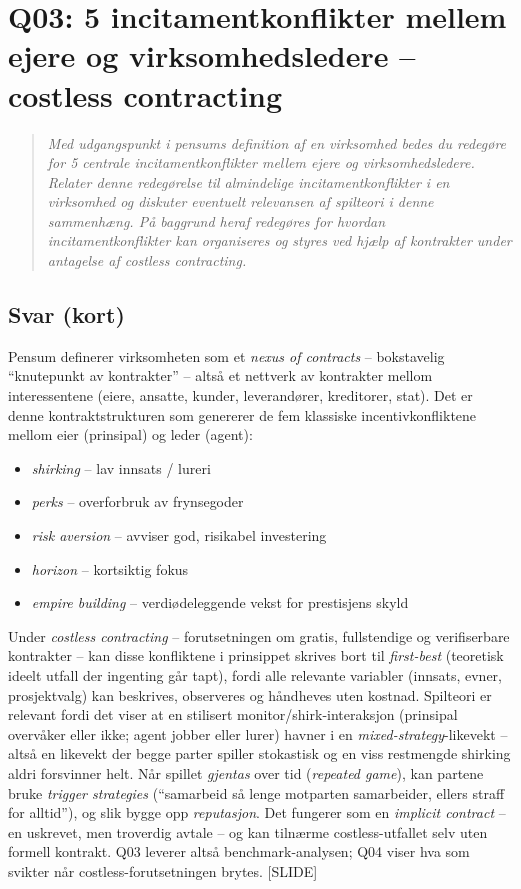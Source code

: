 \section{Q03: 5 incitamentkonflikter mellem ejere og virksomhedsledere -- costless contracting}\label{q:03}

\begin{quote}
\emph{Med udgangspunkt i pensums definition af en virksomhed bedes du redegøre for 5 centrale incitamentkonflikter mellem ejere og virksomhedsledere. Relater denne redegørelse til almindelige incitamentkonflikter i en virksomhed og diskuter eventuelt relevansen af spilteori i denne sammenhæng. På baggrund heraf redegøres for hvordan incitamentkonflikter kan organiseres og styres ved hjælp af kontrakter under antagelse af costless contracting.}
\end{quote}

\subsection*{Svar (kort)}
Pensum definerer virksomheten som et \emph{nexus of contracts} -- bokstavelig ``knutepunkt av kontrakter'' -- altså et nettverk av kontrakter mellom interessentene (eiere, ansatte, kunder, leverandører, kreditorer, stat). Det er denne kontraktstrukturen som genererer de fem klassiske incentivkonfliktene mellom eier (prinsipal) og leder (agent):
\begin{itemize}\setlength{\itemsep}{2pt}
\item \emph{shirking} -- lav innsats / lureri
\item \emph{perks} -- overforbruk av frynsegoder
\item \emph{risk aversion} -- avviser god, risikabel investering
\item \emph{horizon} -- kortsiktig fokus
\item \emph{empire building} -- verdiødeleggende vekst for prestisjens skyld
\end{itemize}
Under \emph{costless contracting} -- forutsetningen om gratis, fullstendige og verifiserbare kontrakter -- kan disse konfliktene i prinsippet skrives bort til \emph{first-best} (teoretisk ideelt utfall der ingenting går tapt), fordi alle relevante variabler (innsats, evner, prosjektvalg) kan beskrives, observeres og håndheves uten kostnad. Spilteori er relevant fordi det viser at en stilisert monitor/shirk-interaksjon (prinsipal overvåker eller ikke; agent jobber eller lurer) havner i en \emph{mixed-strategy}-likevekt -- altså en likevekt der begge parter spiller stokastisk og en viss restmengde shirking aldri forsvinner helt. Når spillet \emph{gjentas} over tid (\emph{repeated game}), kan partene bruke \emph{trigger strategies} (``samarbeid så lenge motparten samarbeider, ellers straff for alltid''), og slik bygge opp \emph{reputasjon}. Det fungerer som en \emph{implicit contract} -- en uskrevet, men troverdig avtale -- og kan tilnærme costless-utfallet selv uten formell kontrakt. Q03 leverer altså benchmark-analysen; Q04 viser hva som svikter når costless-forutsetningen brytes. [SLIDE]

